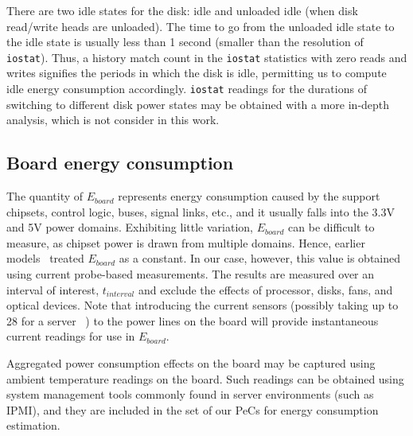 \documentclass[prodmode,acmtaco,pdftex]{acmsmall}
\begin{document}
There are two idle states for the disk: idle and unloaded idle (when
disk read/write heads are unloaded).  The time to go from the unloaded
idle state to the idle state is usually less than 1 second (smaller than
the resolution of \texttt{iostat}).  Thus, a history match count in the
\texttt{iostat} statistics with zero reads and writes signifies the
periods in which the disk is idle, permitting us to compute idle energy
consumption accordingly.  \texttt{iostat} readings for the durations of
switching to different disk power states may be obtained with a more
in-depth analysis, which is not consider in this work.
\subsection{Board energy consumption}
\label{sec:board}
The quantity of $E_{board}$ represents energy consumption caused by the
support chipsets, control logic, buses, signal links, etc., and it
usually falls into the 3.3V and 5V power domains.  Exhibiting little
variation, $E_{board}$ can be difficult to measure, as chipset power is
drawn from multiple domains.  Hence, earlier
models~\cite{Kansal2010,Bircher2011} treated $E_{board}$ as a
constant. In our case, however, this value is obtained using current
probe-based measurements.  The results are measured over an interval of
interest, $t_{interval}$ and exclude the effects of processor, disks,
fans, and optical devices.  Note that introducing the current sensors
(possibly taking up to 28 for a server ~\cite{SSI2004}) to the power
lines on the board will provide instantaneous current readings for use
in $E_{board}$.

Aggregated power consumption effects on the board may be captured using
ambient temperature readings on the board.  Such readings can be
obtained using system management tools commonly found in server
environments (such as IPMI), and they are included in the set of our PeCs
for energy consumption estimation.
\end{document}
